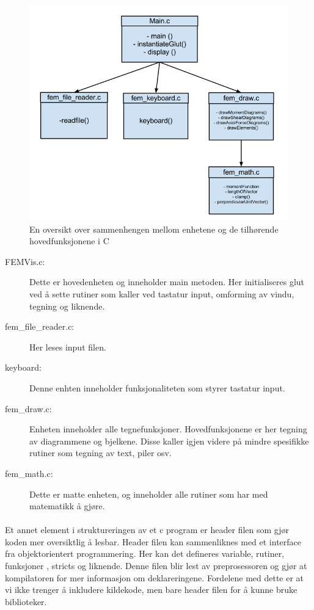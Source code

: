 \documentclass[10pt,a4paper, norsk]{article}
\begin{document}
\begin{figure}[h] 
\centering
\includegraphics[scale=0.35]{CStructure.png} 
\caption{En oversikt over sammenhengen mellom enhetene og de tilhørende hovedfunksjonene i C}
\label{fig:cStruktur}
\end{figure}     

\begin{description}
\item[FEMVis.c:] Dette er hovedenheten og inneholder main metoden. Her initialiseres glut ved å sette rutiner som kaller ved tastatur input, omforming av vindu, tegning og liknende. 
\item[fem\_file\_reader.c:] Her leses input filen.
\item[keyboard:] Denne enhten inneholder funksjonaliteten som styrer tastatur input.
\item[fem\_draw.c:] Enheten inneholder alle tegnefunksjoner. Hovedfunksjonene er her tegning av diagrammene og bjelkene. Disse kaller igjen videre på mindre spesifikke rutiner som tegning av text, piler osv.
\item[fem\_math.c:] Dette er matte enheten, og inneholder alle rutiner som har med matematikk å gjøre. 
\end{description}

\paragraph*{	}
Et annet element i struktureringen av et c program er header filen som gjør koden mer oversiktlig å lesbar. Header filen kan sammenliknes med et interface fra objektorientert programmering. Her kan det defineres variable, rutiner, funksjoner , stricts og liknende. Denne filen blir lest av preprosessoren og gjør at kompilatoren for mer informasjon om deklareringene. Fordelene med dette er at vi ikke trenger å inkludere kildekode, men bare header filen for å kunne bruke biblioteker.
\end{document}
